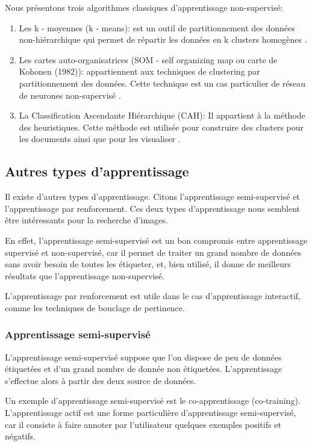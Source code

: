 \documentclass[12pt]{article}
\begin{document}
Nous présentons trois algorithmes classiques d'apprentissage non-supervisé:
\begin{enumerate}
	\item Les k - moyennes (k - means): est un outil de partitionnement des données non-hiérarchique qui permet de répartir les données en k clusters homogènes \cite{5}.
	\item Les cartes auto-organisatrices (SOM - self organizing map ou carte de Kohonen (1982)): appartiennent aux techniques de clustering par partitionnement des données. Cette technique est un cas particulier de réseau de neurones non-supervisé \cite{6}.
	\item La Classification Ascendante Hiérarchique (CAH): Il appartient à la méthode des heuristiques. Cette méthode est utilisée pour construire des clusters pour les documents ainsi que pour les visualiser \cite{7}.
\end{enumerate}
\subsection{Autres types d'apprentissage}
Il existe d'autres types d'apprentissage. Citons l'apprentissage semi-supervisé et l'apprentissage par renforcement. Ces deux types d'apprentissage nous semblent être intéressants pour la recherche d'images.

En effet, l'apprentissage semi-supervisé est un bon compromis entre apprentissage supervisé et non-supervisé, car il permet de traiter un grand nombre de données sans avoir besoin de toutes les étiqueter, et, bien utilisé, il donne de meilleurs résultats que l'apprentissage non-supervisé.

L'apprentissage par renforcement est utile dans le cas d'apprentissage interactif, comme les techniques de bouclage de pertinence.
\subsubsection{Apprentissage semi-supervisé}
L’apprentissage semi-supervisé suppose que l’on dispose de peu de données étiquetées et d’un grand nombre de donnée non étiquetées. L’apprentissage s’effectue alors à partir des deux source de données.
	
Un exemple d'apprentissage semi-supervisé est le co-apprentissage (co-training). L'apprentissage actif est une forme particulière d'apprentissage semi-supervisé, car il consiste à faire annoter par l'utilisateur quelques exemples positifs et négatifs.
	
\end{document}
